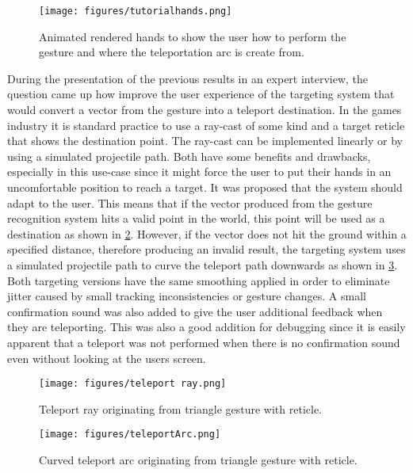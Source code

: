 \begin{figure}[!ht]
    \centering
    \texttt{[image: figures/tutorialhands.png]}
    \caption{Animated rendered hands to show the user how to perform the gesture and where the teleportation arc is create from.}
    \label{fig:tutorial}
\end{figure}

During the presentation of the previous results in an expert interview, the question came up how improve the user experience of the targeting system that would convert a vector from the gesture into a teleport destination. In the games industry it is standard practice to use a ray-cast of some kind and a target reticle that shows the destination point. The ray-cast can be implemented linearly or by using a simulated projectile path. Both have some benefits and drawbacks, especially in this use-case since it might force the user to put their hands in an uncomfortable position to reach a target. It was proposed that the system should adapt to the user. This means that if the vector produced from the gesture recognition system hits a valid point in the world, this point will be used as a destination as shown in \ref{fig:tpray}. However, if the vector does not hit the ground within a specified distance, therefore producing an invalid result, the targeting system uses a simulated projectile path to curve the teleport path downwards as shown in \ref{fig:tparc}. Both targeting versions have the same smoothing applied in order to eliminate jitter caused by small tracking inconsistencies or gesture changes. A small confirmation sound was also added to give the user additional feedback when they are teleporting. This was also a good addition for debugging since it is easily apparent that a teleport was not performed when there is no confirmation sound even without looking at the users screen.

\begin{figure}[!ht]
    \centering
    \texttt{[image: figures/teleport ray.png]}
    \caption{Teleport ray originating from triangle gesture with reticle.}
    \label{fig:tpray}
\end{figure}
\begin{figure}[!ht]
    \centering
    \texttt{[image: figures/teleportArc.png]}
    \caption{Curved teleport arc originating from triangle gesture with reticle.}
    \label{fig:tparc}
\end{figure}

